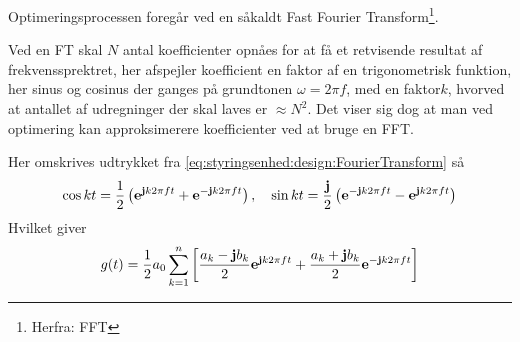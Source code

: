 Optimeringsprocessen foregår ved en såkaldt Fast Fourier Transform\footnote{Herfra: FFT}.

Ved en FT skal $N$ antal koefficienter opnåes for at få et retvisende resultat af frekvenssprektret, her  afspejler koefficient en faktor af en trigonometrisk funktion, her sinus og cosinus der ganges på grundtonen $\omega = 2 \pi f$, med en faktor$k$, hvorved at antallet af udregninger der skal laves er $\approx N^2$. Det viser sig dog at man ved optimering kan approksimerere koefficienter ved at bruge en FFT\cite{Bronshtein2015}.

Her omskrives udtrykket fra \eqref{eq:styringsenhed:design:FourierTransform} så 
\begin{equation}
    \cos k t = \frac{1}{2} \left(\mathrm{\mathbf{e}}^{ \mathbf{j} k 2\pi f t} +\mathrm{\mathbf{e}}^{ -\mathbf{j} k 2\pi f t}\right),\quad 
    \sin k t = \frac{\mathbf{j}}{2} \left(\mathrm{\mathbf{e}}^{ -\mathbf{j} k 2\pi f t} -\mathrm{\mathbf{e}}^{\mathbf{j} k 2\pi f t}\right) 
\end{equation}
Hvilket giver 
\begin{equation}
   g(t) = \frac{1}{2}a_0 \sum_{k = 1}^{n}\left[ \frac{a_k - \mathbf{j} b_k}{2} \mathrm{\mathbf{e}}^{\mathbf{j} k 2\pi f t} + \frac{a_k + \mathbf{j} b_k}{2} \mathrm{\mathbf{e}}^{ - \mathbf{j} k 2\pi f t} \right]
\end{equation} 

\tbr